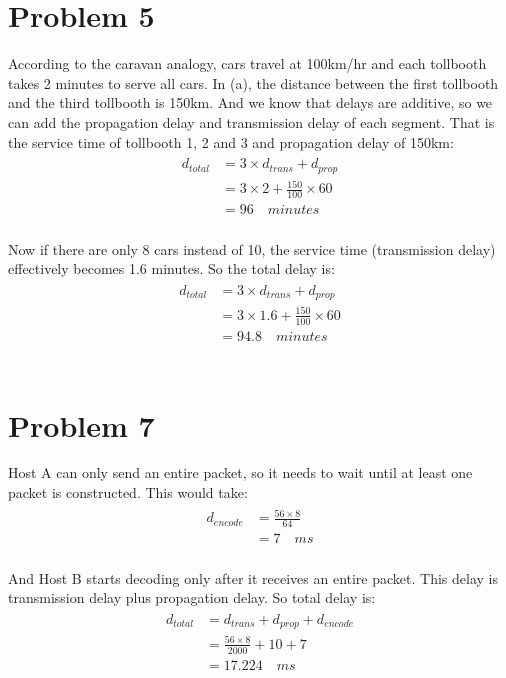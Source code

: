 \documentclass[paper=a4, fontsize=11pt]{scrartcl} %
\numberwithin{equation}{section} %
\numberwithin{figure}{section} %
\numberwithin{table}{section} %
\begin{document}
\section*{Problem 5}
According to the caravan analogy, cars travel at 100km/hr and each tollbooth takes 2 minutes to serve all cars.
In (a), the distance between the first tollbooth and the third tollbooth is 150km. And we know that delays are
additive, so we can add the propagation delay and transmission delay of each segment. That is the service time of
tollbooth 1, 2 and 3 and propagation delay of 150km:
\begin{align} 
\begin{split}
d_{total} &= 3 \times d_{trans} + d_{prop} \\
&= 3 \times 2 + \frac{150}{100} \times 60 \\
&= 96 \quad minutes
\end{split}					
\end{align}
\\
Now if there are only 8 cars instead of 10, the service time (transmission delay) effectively becomes 1.6 minutes.
So the total delay is:
\begin{align} 
\begin{split}
d_{total} &= 3 \times d_{trans} + d_{prop} \\
&= 3 \times 1.6 + \frac{150}{100} \times 60 \\
&= 94.8 \quad minutes
\end{split}					
\end{align}
\\



\section*{Problem 7}
Host A can only send an entire packet, so it needs to wait until at least one packet is constructed. This would take:
\begin{align} 
\begin{split}
d_{encode} &= \frac{56 \times 8}{64} \\
&= 7 \quad ms
\end{split}					
\end{align}
\\
And Host B starts decoding only after it receives an entire packet. This delay is transmission delay plus propagation delay. So total delay is:
\begin{align} 
\begin{split}
d_{total} &= d_{trans} + d_{prop} + d_{encode} \\
&= \frac{56 \times 8}{2000} + 10 + 7 \\
&= 17.224 \quad ms
\end{split}					
\end{align}
\\
\end{document}
